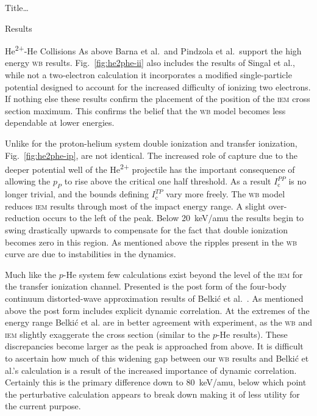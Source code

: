 \documentclass[letterpaper, 10 pt]{report}
\begin{document}
\begin{chapter}{ Title\dots \label{chap:p-he2p-he}}
\begin{section}{Results \label{sec:phe2p-res}}
\begin{subsection}{\texorpdfstring{He\textsuperscript{2+}}{He2+}-He Collisions 
                         \label{sec:he2phe-res}}
         As above Barna et al.\ and Pindzola et al.\ support the high energy \textsc{wb}
         results. Fig.~\ref{fig:he2phe-ii} also includes the results of Singal et al., while
         not a two-electron calculation it incorporates a modified single-particle potential designed to
         account for the increased difficulty of ionizing two electrons. If nothing else these results
         confirm the placement of the position of the \textsc{iem} cross section maximum. This confirms
         the belief that the \textsc{wb} model becomes less dependable at lower energies.

         Unlike for the proton-helium system double ionization and transfer ionization,
         Fig.~\ref{fig:he2phe-ip}, are not identical. The increased role of capture due to the deeper
         potential well of the He\textsuperscript{2+} projectile has the important consequence of
         allowing the $p_P$ to rise above the critical one half threshold. As a result
         $I^{PP}_\mathrm{c}$ is no longer trivial, and the bounds defining $I^{TP}_\mathrm{c}$ vary more
         freely. The \textsc{wb} model reduces \textsc{iem} results through most of the impact energy
         range. A slight over-reduction occurs to the left of the peak. Below 20~keV/amu the results
         begin to swing drastically upwards to compensate for the fact that double ionization becomes
         zero in this region. As mentioned above the ripples present in the \textsc{wb} curve are due to
         instabilities in the dynamics.

         Much like the $p$-He system few calculations exist beyond the level of the \textsc{iem} for the
         transfer ionization channel. Presented is the post form of the four-body continuum
         distorted-wave  approximation results of Belki\'{c} et al.~\cite{BMM-97}. As mentioned above
         the post form includes explicit dynamic correlation. At the extremes of the energy range
         Belki\'{c} et al. are in better agreement with experiment, as the \textsc{wb} and \textsc{iem}
         slightly exaggerate the cross section (similar to the $p$-He results). These discrepancies
         become larger as the peak is approached from above. It is difficult to ascertain how much of
         this widening gap between our \textsc{wb} results and Belki\'{c} et al.'s calculation is a
         result of the increased importance of dynamic correlation. Certainly this is the primary
         difference down to 80~keV/amu, below which point the perturbative calculation appears to break
         down making it of less utility for the current purpose.
 

\end{subsection}
\end{section}
\end{chapter}
\end{document}
